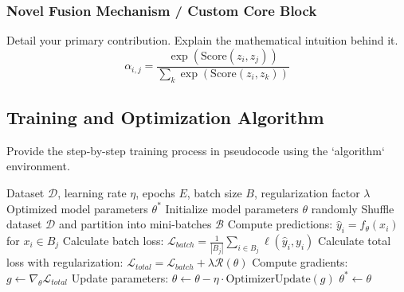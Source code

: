 \subsubsection{Novel Fusion Mechanism / Custom Core Block}
Detail your primary contribution. Explain the mathematical intuition behind it.
\begin{equation}
\alpha_{i,j} = \frac{\exp(\text{Score}(z_i, z_j))}{\sum_{k} \exp(\text{Score}(z_i, z_k))}
\label{eq:attention_scores}
\end{equation}

\subsection{Training and Optimization Algorithm}
Provide the step-by-step training process in pseudocode using the `algorithm` environment.

\begin{algorithm}
\caption{Training Procedure of Proposed Method}\label{alg:training_method}
\begin{algorithmic}[1]
\Require Dataset $\mathcal{D}$, learning rate $\eta$, epochs $E$, batch size $B$, regularization factor $\lambda$
\Ensure Optimized model parameters $\theta^*$
\State Initialize model parameters $\theta$ randomly
    \State Shuffle dataset $\mathcal{D}$ and partition into mini-batches $\mathcal{B}$
        \State Compute predictions: $\hat{y}_i = f_\theta(x_i)$ for $x_i \in B_j$
        \State Calculate batch loss: $\mathcal{L}_{batch} = \frac{1}{|B_j|}\sum_{i \in B_j} \ell(\hat{y}_i, y_i)$
        \State Calculate total loss with regularization: $\mathcal{L}_{total} = \mathcal{L}_{batch} + \lambda \mathcal{R}(\theta)$
        \State Compute gradients: $g \leftarrow \nabla_\theta \mathcal{L}_{total}$
        \State Update parameters: $\theta \leftarrow \theta - \eta \cdot \text{OptimizerUpdate}(g)$
    \EndFor
\EndFor
\State \Return $\theta^* \leftarrow \theta$
\end{algorithmic}
\end{algorithm}

